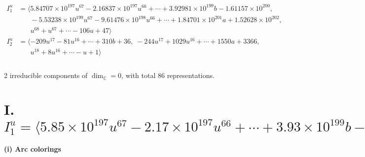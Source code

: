 \documentclass[1p]{elsarticle_modified}
\theoremstyle{definition}
\begin{document}
\begin{align*}
I^u_{1}&=\langle 
5.84707\times10^{197} u^{67}-2.16837\times10^{197} u^{66}+\cdots+3.92981\times10^{199} b-1.61157\times10^{200},\\
\phantom{I^u_{1}}&\phantom{= \langle  }-5.53238\times10^{199} u^{67}-9.61476\times10^{198} u^{66}+\cdots+1.84701\times10^{201} a+1.52628\times10^{202},\\
\phantom{I^u_{1}}&\phantom{= \langle  }u^{68}+u^{67}+\cdots-106 u+47\rangle \\
I^u_{2}&=\langle 
-209 u^{17}-81 u^{16}+\cdots+310 b+36,\;-244 u^{17}+1029 u^{16}+\cdots+1550 a+3366,\\
\phantom{I^u_{2}}&\phantom{= \langle  }u^{18}+8 u^{16}+\cdots- u+1\rangle \\
\\
\end{align*}
\raggedright * 2 irreducible components of $\dim_{\mathbb{C}}=0$, with total 86 representations.\\
\newpage
\renewcommand{\arraystretch}{1}
\centering \section*{I. $I^u_{1}= \langle 5.85\times10^{197} u^{67}-2.17\times10^{197} u^{66}+\cdots+3.93\times10^{199} b-1.61\times10^{200},\;-5.53\times10^{199} u^{67}-9.61\times10^{198} u^{66}+\cdots+1.85\times10^{201} a+1.53\times10^{202},\;u^{68}+u^{67}+\cdots-106 u+47 \rangle$}
\flushleft \textbf{(i) Arc colorings}\\
\end{document}
